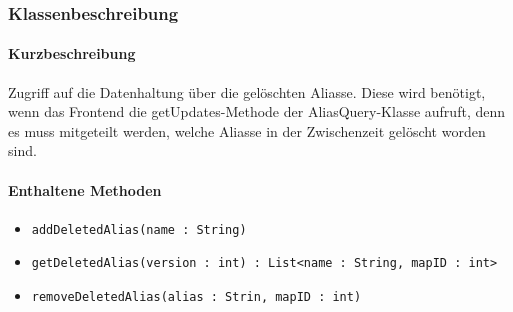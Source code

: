 \subsubsection*{Klassenbeschreibung}%
\paragraph*{Kurzbeschreibung}
Zugriff auf die Datenhaltung über die gelöschten Aliasse. Diese wird benötigt, wenn das Frontend die getUpdates-Methode der AliasQuery-Klasse aufruft, 
denn es muss mitgeteilt werden, welche Aliasse in der Zwischenzeit gelöscht worden sind.

\paragraph*{Enthaltene Methoden}
\begin{itemize}
    \item \texttt{addDeletedAlias(name : String)}
    \item \texttt{getDeletedAlias(version : int) : List<name : String, mapID : int>}
    \item \texttt{removeDeletedAlias(alias : Strin, mapID : int)}
\end{itemize}
